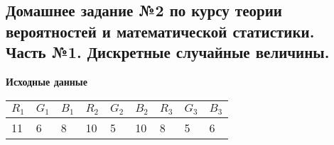 \documentclass{article}
\begin{document}
\begin{center}

\section*{Домашнее задание №2 по курсу теории вероятностей и математической статистики. \\ Часть №1. Дискретные случайные величины.}

\vspace{\baselineskip}
\textbf{\large Исходные данные}
\vspace{\baselineskip}

\begin{tabular}[c]{p{0.5cm}|p{0.5cm}|p{0.5cm}|p{0.5cm}|p{0.5cm}|p{0.5cm}|p{0.5cm}|p{0.5cm}|p{0.5cm}}
\textbf{\begin{math}R_1\end{math}} & \textbf{\begin{math}G_1\end{math}} & \textbf{\begin{math}B_1\end{math}} & \textbf{\begin{math}R_2\end{math}} & \textbf{\begin{math}G_2\end{math}} & \textbf{\begin{math}B_2\end{math}} & \textbf{\begin{math}R_3\end{math}} & \textbf{\begin{math}G_3\end{math}} & \textbf{\begin{math}B_3\end{math}} 
\\[1mm] \hline
11 & 6 & 8 & 10 & 5 & 10 & 8 & 5 & 6  
\end{tabular}

\end{center}
\vspace{\baselineskip}\vspace{\baselineskip}\vspace{\baselineskip}\vspace{\baselineskip}\vspace{\baselineskip}\vspace{\baselineskip}\vspace{\baselineskip}\vspace{\baselineskip}\vspace{\baselineskip}\vspace{\baselineskip}\vspace{\baselineskip}\vspace{\baselineskip}\vspace{\baselineskip}\vspace{\baselineskip}\vspace{\baselineskip}\vspace{\baselineskip}\vspace{\baselineskip}\vspace{\baselineskip}\vspace{\baselineskip}\vspace{\baselineskip}
\end{document}
